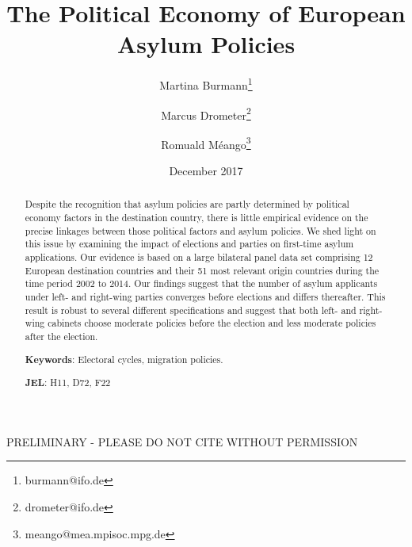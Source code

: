 \documentclass[a4paper,12pt]{article}
\title{The Political Economy of European Asylum Policies}
\date{December 2017}
\author[,1]{Martina Burmann\thanks{burmann@ifo.de}}
\author[,1]{Marcus Drometer\thanks{drometer@ifo.de}}
\author[,2]{Romuald M\'eango\thanks{meango@mea.mpisoc.mpg.de}}
\affil[1]{ifo Institute for Economic Research, Munich}
\affil[2]{Munich Center for the Economics of Aging (MEA)}
\begin{document}
      \maketitle

\begin{center}
PRELIMINARY - PLEASE DO NOT CITE WITHOUT PERMISSION
\end{center}
\begin{abstract}
\singlespacing
\noindent 
Despite the recognition that asylum policies are partly determined by political economy factors in the destination country, there is little empirical evidence on the precise linkages between those political factors and asylum policies. We shed light on this issue by examining the impact of elections and parties on first-time asylum applications.  Our evidence is based on a large bilateral panel data set comprising 12 European destination countries and their 51 most relevant origin countries during the time period 2002 to 2014. Our findings suggest that  the number of asylum applicants under left- and right-wing parties converges before elections and differs thereafter. This result is robust to several different specifications and suggest that both left- and right-wing cabinets choose moderate policies before the election and less moderate policies after the election.


\bigskip

\textbf{Keywords}: Electoral cycles, migration policies.

\textbf{JEL}: H11, D72, F22

\bigskip
\end{abstract}
\setcounter{page}{0} \renewcommand{\thepage}{}
\pagebreak{}\pagebreak

\end{document}
